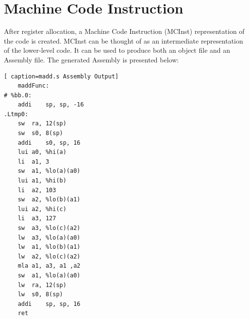 \section{Machine Code Instruction}
After register allocation, a Machine Code Instruction (MCInst) representation of the code is created. MCInst can be thought of as an intermediate representation of the lower-level code. It can be used to produce both an object file and an Assembly file. The generated Assembly is presented below:
\begin{lstlisting}[ caption=madd.s Assembly Output]
    maddFunc:           
# %bb.0:
	addi	sp, sp, -16
.Ltmp0:
	sw	ra, 12(sp)     
	sw	s0, 8(sp)     
	addi	s0, sp, 16
	lui	a0, %hi(a)
	li	a1, 3
	sw	a1, %lo(a)(a0)
	lui	a1, %hi(b)
	li	a2, 103
	sw	a2, %lo(b)(a1)
	lui	a2, %hi(c)
	li	a3, 127
	sw	a3, %lo(c)(a2)
	lw	a3, %lo(a)(a0)
	lw	a1, %lo(b)(a1)
	lw	a2, %lo(c)(a2)
	mla	a1, a3, a1 ,a2
	sw	a1, %lo(a)(a0)
	lw	ra, 12(sp)   
	lw	s0, 8(sp)   
	addi	sp, sp, 16
	ret
\end{lstlisting}
